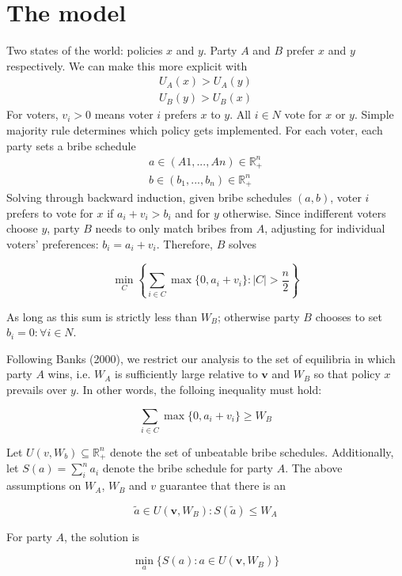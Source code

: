 \documentclass[12pt,a4paper]{article}
\begin{document}
\section{The model}

Two states of the world: policies $x$ and $y$. Party $A$ and $B$ prefer $x$ and $y$ respectively. We can make this more explicit with
\begin{align*}
    U_A(x) > U_A(y)\\
    U_B(y) > U_B(x)
\end{align*}
For voters, $v_i > 0$ means voter $i$ prefers $x$ to $y$. All $i \in N$ vote for $x$ or $y$. Simple majority rule determines which policy gets implemented. For each voter, each party sets a bribe schedule
\begin{align*}
    a \in (A1, ..., An) \in \mathbb{R}^n_+\\
    b \in (b_1, ..., b_n) \in \mathbb{R}^n_+
\end{align*}
Solving through backward induction, given bribe schedules $(a,b)$, voter $i$ prefers to vote for $x$ if $a_i + v_i > b_i$ and for $y$ otherwise. Since indifferent voters choose $y$, party $B$ needs to only match bribes from $A$, adjusting for individual voters' preferences: $b_i = a_i + v_i$. Therefore, $B$ solves

$$\min_C \left\{\sum_{i \in C} \max\{0, a_i + v_i\} : |C| > \frac{n}{2} \right\}$$

As long as this sum is strictly less than $W_B$; otherwise party $B$ chooses to set $b_i = 0 : \forall i \in N$.

Following Banks (2000), we restrict our analysis to the set of equilibria in which party $A$ wins, i.e. $W_A$ is sufficiently large relative to $\mathbf{v}$ and $W_B$ so that policy $x$ prevails over $y$. In other words, the folloing inequality must hold:

$$ \sum_{i \in C} \max\{0, a_i + v_i\} \geq W_B$$

Let $U(v, W_b) \subseteq \mathbb{R}^n_+$ denote the set of unbeatable bribe schedules. Additionally, let $S(a) = \sum^n_i a_i$ denote the bribe schedule for party $A$. The above assumptions on $W_A$, $W_B$ and $v$ guarantee that there is an

$$\tilde{a} \in U(\mathbf{v}, W_B) : S(\tilde{a}) \leq W_A$$

For party $A$, the solution is

\begin{equation}
\label{eqn:solution}
\min_a\{S(a) : a \in U(\mathbf{v}, W_B) \}
\end{equation}
\end{document}
